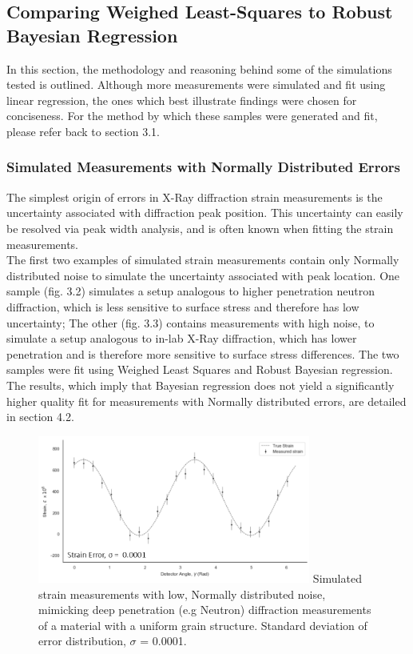 \subsection{Comparing Weighed Least-Squares to Robust Bayesian Regression}
\label{subsec:subsubsec01}

In this section, the methodology and reasoning behind some of the simulations tested is outlined. Although more measurements were simulated and fit using linear regression, the ones which best illustrate findings were chosen for conciseness. For the method by which these samples were generated and fit, please refer back to section 3.1.\\

\subsubsection{Simulated Measurements with Normally Distributed Errors}

The simplest origin of errors in X-Ray diffraction strain measurements is the uncertainty associated with diffraction peak position. This uncertainty can easily be resolved via peak width analysis, and is often known when fitting the strain measurements.\\

The first two examples of simulated strain measurements contain only Normally distributed noise to simulate the uncertainty associated with peak location. One sample (fig. 3.2) simulates a setup analogous to higher penetration neutron diffraction, which is less sensitive to surface stress and therefore has low uncertainty; The other (fig. 3.3) contains measurements with high noise, to simulate a setup analogous to in-lab X-Ray diffraction, which has lower penetration and is therefore more sensitive to surface stress differences. The two samples were fit using Weighed Least Squares and Robust Bayesian regression. The results, which imply that Bayesian regression does not yield a significantly higher quality fit for measurements with Normally distributed errors, are detailed in section 4.2. 


 \begin{figure}[h]
 	\centering
 	\includegraphics[width=0.8\textwidth]{chapters/chapter02/fig02/sample1.png}
 	\mycaption
 	{Simulated strain measurements with low, Normally distributed noise, mimicking deep penetration (e.g Neutron) diffraction measurements of a material with a uniform grain structure. Standard deviation of error distribution, $\sigma$ = 0.0001.}
    \label{fig:RHP02}
 \end{figure}

